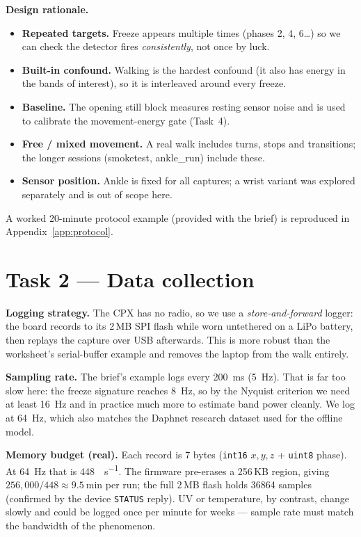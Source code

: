 \documentclass[11pt,a4paper]{article}
\begin{document}
\textbf{Design rationale.}
\begin{itemize}
\item \textbf{Repeated targets.} Freeze appears multiple times (phases 2, 4, 6\dots)
      so we can check the detector fires \emph{consistently}, not once by luck.
\item \textbf{Built-in confound.} Walking is the hardest confound (it also has energy
      in the bands of interest), so it is interleaved around every freeze.
\item \textbf{Baseline.} The opening still block measures resting sensor noise and is
      used to calibrate the movement-energy gate (Task~4).
\item \textbf{Free / mixed movement.} A real walk includes turns, stops and
      transitions; the longer sessions (smoketest, ankle\_run) include these.
\item \textbf{Sensor position.} Ankle is fixed for all captures; a wrist variant was
      explored separately and is out of scope here.
\end{itemize}
A worked 20-minute protocol example (provided with the brief) is reproduced in
Appendix~\ref{app:protocol}.

\section{Task 2 --- Data collection}

\textbf{Logging strategy.} The CPX has no radio, so we use a \emph{store-and-forward}
logger: the board records to its 2\,MB SPI flash while worn untethered on a LiPo
battery, then replays the capture over USB afterwards. This is more robust than the
worksheet's serial-buffer example and removes the laptop from the walk entirely.

\textbf{Sampling rate.} The brief's example logs every \SI{200}{\milli\second}
(\SI{5}{\hertz}). That is far too slow here: the freeze signature reaches
\SI{8}{\hertz}, so by the Nyquist criterion we need at least \SI{16}{\hertz} and in
practice much more to estimate band power cleanly. We log at \SI{64}{\hertz}, which
also matches the Daphnet research dataset used for the offline model.

\textbf{Memory budget (real).} Each record is 7 bytes (\texttt{int16} $x,y,z$ +
\texttt{uint8} phase). At \SI{64}{\hertz} that is \SI{448}{\byte\per\second}. The
firmware pre-erases a 256\,KB region, giving
$256{,}000 / 448 \approx \SI{9.5}{\minute}$ per run; the full 2\,MB flash holds
\num{36864} samples (confirmed by the device \texttt{STATUS} reply). UV or
temperature, by contrast, change slowly and could be logged once per minute for
weeks --- sample rate must match the bandwidth of the phenomenon.
\end{document}
